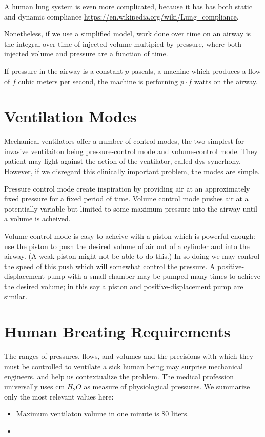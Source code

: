 \documentclass{article}
\begin{document}
A human lung system is even more
complicated, because it has has
both static and dynamic compliance \url{https://en.wikipedia.org/wiki/Lung_compliance}.

Nonetheless, if we use a simplified model, work done over time
on an airway is the integral over time of injected volume
multipied by pressure, where both injected volume and
pressure are a function of time.

If pressure in the airway is a constant $p$ pascals, a machine which produces a flow of $f$ cubic meters
per second, the machine is perforning $p \cdot f$ watts on the airway.


\section{Ventilation Modes}

Mechanical ventilators offer a number of control modes, the two
simplest for invasive ventilaiton
being pressure-control mode and volume-control mode.
They patient may fight against the action of the ventilator,
called dys-syncrhony. However, if we disregard this clinically
important problem, the modes are simple.

Pressure control mode create inspiration by providing air
at an approximately fixed pressure for a fixed period of time.
Volume control mode pushes air at a potentially variable but
limited to some maximum pressure into the airway until a volume
is acheived.

Volume control mode is easy to acheive with a piston which is
powerful enough: use the piston to push the desired volume of
air out of a cylinder and into the airway. (A weak piston might
not be able to do this.) In so doing we may control the speed
of this push which will somewhat control the pressure.
A positive-displacement pump with a small chamber may be pumped
many times to achieve the desired volume; in this say a
piston and positive-displacement pump are similar.

\section{Human Breating Requirements}

The ranges of pressures, flows, and volumes and the precisions with which
they must be controlled to ventilate a sick human being may surprise
mechanical engineers, and help us contextualize the problem.
The medical profession universally uses cm $H_2O$ as measure of physiological
pressures. We summarize only the most relevant values here:
\begin{itemize}
\item Maximum ventilaton volume in one minute is 80 liters.
  \item
  \end{itemize}
\end{document}
